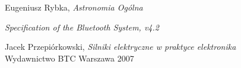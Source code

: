 \begin{thebibliography}{9}

 Eugeniusz Rybka, \emph{Astronomia Ogólna}

 \emph{Specification of the Bluetooth System, v4.2}
	
 Jacek Przepiórkowski, \emph{Silniki elektryczne
	w praktyce elektronika} \\ Wydawnictwo BTC Warszawa 2007

\end{thebibliography}
